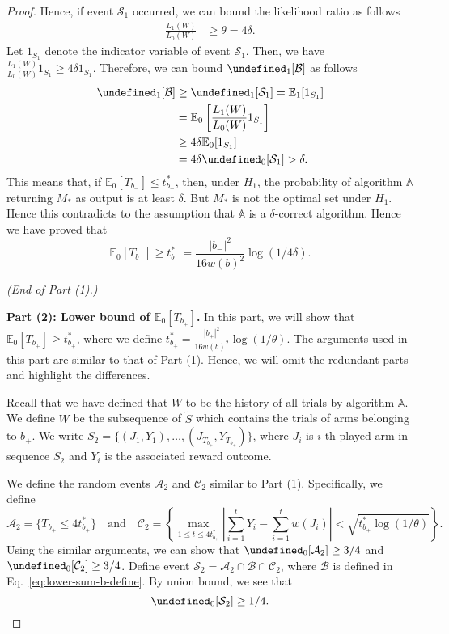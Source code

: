 \documentclass{article}
\newcommand{\E}{\mathbb E}
\let\Pr\undefined
\DeclareMathOperator{\Pr}{Pr}
\begin{document}
\begin{spacing}{1.1}
\begin{proof}
Hence, if event $\mathcal S_1$ occurred, we can bound the likelihood ratio as follows
\begin{align}
\frac{L_1(W)}{L_0(W)} &\ge \theta = 4\delta.
\end{align}
Let $1_{S_1}$ denote the indicator variable of event $\mathcal S_1$.
Then, we have $
\frac{L_1(W)}{L_0(W)} 1_{S_1} \ge 4\delta 1_{S_1}$.
Therefore, we can bound $\Pr_1[\mathcal B]$ as follows
\begin{align}
\Pr_1[\mathcal B] &\ge \Pr_1[\mathcal S_1] = \E_1[1_{S_1}] \nonumber \\
				  &= \E_0\left[\frac{L_1(W)}{L_0(W)} 1_{S_1}\right] \nonumber \\
				  &\ge 4\delta \E_0[1_{S_1}] \nonumber \\
				  &= 4\delta \Pr_0[\mathcal S_1] > \delta \label{eq:lower-sum-case-1-final}.
\end{align}
This means that, if $\E_0[T_{b_-}] \le t_{b_-}^*$, then, under $H_1$, the probability of algorithm $\mathbb A$ returning $M_*$ as output is at least $\delta$. 
But $M_*$ is not the optimal set under $H_1$. Hence this contradicts to the assumption that $\mathbb A$ is a $\delta$-correct algorithm.
Hence we have proved that 
\begin{equation}
\label{eq:lower-sum-case-1-a}
\E_0[T_{b_-}] \ge t_{b_-}^* = \frac{|b_-|^2}{16 w(b)^2}\log(1/4\delta).
\end{equation}

\emph{(End of Part (1).)}

\textbf{Part (2): Lower bound of $\E_0[T_{b_+}]$.} In this part, we will show that $\E_0[T_{b_+}]\ge t_{b_+}^*$, where we define $t_{b_+}^* = \frac{|b_+|^2}{16 w(b)^2}\log(1/\theta)$.
The arguments used in this part are similar to that of Part (1). 
Hence, we will omit the redundant parts and highlight the differences.

Recall that we have defined that $W$ to be the history of all trials by algorithm $\mathbb A$.
We define $W$ be the subsequence of $\tilde S$ which contains the trials of arms belonging to $b_+$.
We write $S_2=\{(J_1,Y_1),\ldots,(J_{T_{b_+}}, Y_{T_{b_+}})\}$, where $J_i$ is $i$-th played arm in sequence $S_2$ and $Y_i$ is the associated reward outcome.

We define the random events $\mathcal A_2$ and $\mathcal C_2$ similar to Part (1).
Specifically, we define 
$$
\mathcal A_2 = \{T_{b_+} \le 4t_{b_+}^* \} \quad\text{and}\quad
\mathcal C_2 = \left\{\max_{1\le t \le 4t_{b_+}^*} \left|\sum_{i=1}^t Y_i - \sum_{i=1}^t w(J_i)\right|  < \sqrt{t_{b_+}^*\log(1/\theta)} \right\}.
$$
Using the similar arguments, we can show that 
$\Pr_0[\mathcal A_2] \ge 3/4$ and $\Pr_0[\mathcal C_2] \ge 3/4$.
Define event $\mathcal S_2 = \mathcal A_2 \cap \mathcal B \cap \mathcal C_2$, where $\mathcal B$ is defined in Eq.~\eqref{eq:lower-sum-b-define}.
By union bound, we see that 
$$
\Pr_0[\mathcal S_2] \ge 1/4.
$$


\end{proof}
\end{spacing}
\end{document}
